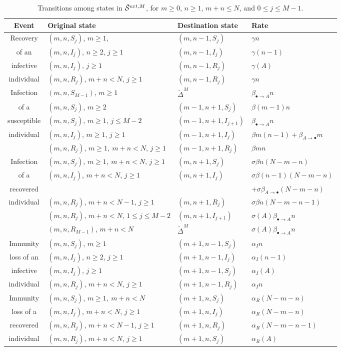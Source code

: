 \documentclass[preprint,12pt]{elsarticle}
\begin{document}
\begin{table}[h]
{\small
\centering
\begin{tabular}{|c|l|l|l|}
\hline
Event & Original state & Destination state & Rate\\
\hline
Recovery & $(m,n,S_j)$, $m\geq1$, & $(m,n-1,S_j)$ & $\gamma n$\\
of an & $(m,n,I_j)$,  $n\geq2$, $j\geq1$ & $(m,n-1,I_j)$ & $\gamma(n-1)$\\
infective & $(m,n,I_j)$, $j\geq1$ & $(m,n-1,R_j)$ & $\gamma(A)$\\
individual & $(m,n,R_j)$, $m+n<N$, $j\geq1$ & $(m,n-1,R_j)$ & $\gamma n$\\
\hline
Infection & $(m,n,S_{M-1})$, $m\geq1$ & ${\tilde \Delta}^M$ & $\beta_{\bullet\rightarrow A}n$\\
of a & $(m,n,S_j)$, $m\geq2$ & $(m-1,n+1,S_j)$ & $\beta(m-1)n$\\
susceptible & $(m,n,S_j)$, $m\geq1$, $j\leq M-2$ & $(m-1,n+1,I_{j+1})$ & $\beta_{\bullet\rightarrow A}n$\\
individual & $(m,n,I_j)$, $m\geq1$, $j\geq1$ & $(m-1,n+1,I_j)$ & $\beta m(n-1)+\beta_{A\rightarrow\bullet}m$\\
 & $(m,n,R_j)$, $m\geq1,\ m+n<N$, $j\geq1$ & $(m-1,n+1,R_j)$ & $\beta mn$\\
\hline
Infection & $(m,n,S_j)$, $m\geq1,\ m+n<N$, $j\geq1$ & $(m,n+1,S_j)$ & $\sigma\beta n(N-m-n)$\\
of a & $(m,n,I_j)$, $m+n<N$, $j\geq1$ & $(m,n+1,I_j)$ & $\sigma\beta(n-1)(N-m-n)$\\
recovered & & & $+\sigma\beta_{A\rightarrow\bullet}(N-m-n)$\\
individual & $(m,n,R_j)$, $m+n<N-1$, $j\geq1$ & $(m,n+1,R_j)$ & $\sigma\beta n(N-m-n-1)$\\
 & $(m,n,R_j)$, $m+n<N$, $1\leq j\leq M-2$ & $(m,n+1,I_{j+1})$ & $\sigma(A)\beta_{\bullet\rightarrow A} n$\\
 & $(m,n,R_{M-1})$, $m+n<N$ & ${\tilde \Delta}^{M}$ & $\sigma(A)\beta_{\bullet\rightarrow A} n$\\
\hline
Immunity & $(m,n,S_j)$, $m\geq1$ & $(m+1,n-1,S_j)$ & $\alpha_I n$\\
loss of an & $(m,n,I_j)$, $n\geq2$, $j\geq1$ & $(m+1,n-1,I_j)$ & $\alpha_I(n-1)$\\
infective & $(m,n,I_j)$, $j\geq1$ & $(m+1,n-1,S_j)$ & $\alpha_I(A)$\\
individual & $(m,n,R_j)$, $m+n<N$, $j\geq1$ & $(m+1,n-1,R_j)$ & $\alpha_I n$\\
\hline
Immunity & $(m,n,S_j)$, $m\geq1,\ m+n<N$ & $(m+1,n,S_j)$ & $\alpha_R (N-m-n)$\\
loss of a & $(m,n,I_j)$, $m+n<N$, $j\geq1$ & $(m+1,n,I_j)$ & $\alpha_R (N-m-n)$\\
recovered & $(m,n,R_j)$, $m+n<N-1$, $j\geq1$ & $(m+1,n,R_j)$ & $\alpha_R (N-m-n-1)$\\
individual & $(m,n,R_j)$, $m+n<N$, $j\geq1$ & $(m+1,n,S_j)$ & $\alpha_R(A)$\\
\hline
\end{tabular}
\caption{Transitions among states in ${\cal \tilde S}^{ext,M}$, for $m\geq0$, $n\geq1$, $m+n\leq N$, and $0\leq j\leq M-1$.}
\label{tab:2new}}
\end{table}
\end{document}
